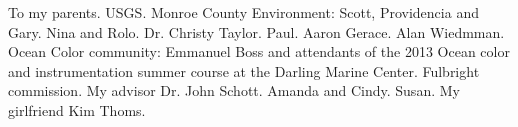 \documentclass{book}
\let\stdsection\chapter
\renewcommand\chapter{\newpage\stdsection}
\begin{document}
\begin{acknowledgements}
\setlength{\parindent}{20pt}
To my parents. USGS. Monroe County Environment: Scott, Providencia and Gary. Nina and Rolo. Dr. Christy Taylor. Paul. Aaron Gerace. Alan Wiedmman. Ocean Color community: Emmanuel Boss and attendants of the 2013 Ocean color and instrumentation summer course at the Darling Marine Center. Fulbright commission. My advisor Dr. John Schott. Amanda and Cindy. Susan. My girlfriend Kim Thoms.
\end{acknowledgements}

\tableofcontents

\listoffigures
{}

\listoftables
{}





% 
% 
% 

\listoftodos

%
%




\printindex
\end{document}

